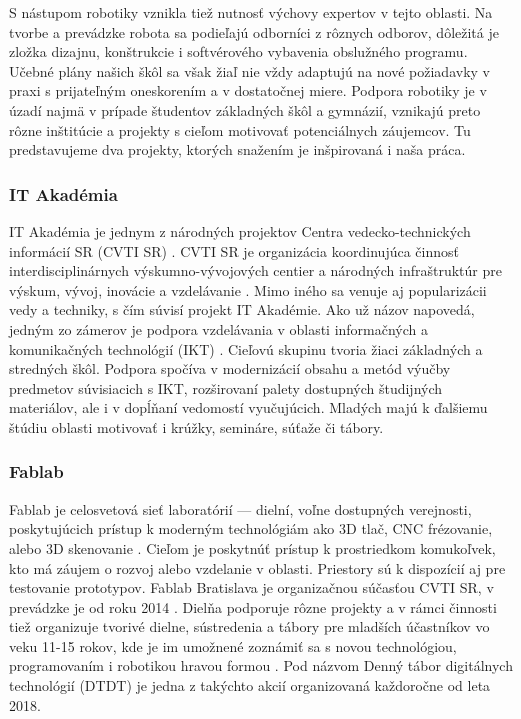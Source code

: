 S nástupom robotiky vznikla tiež nutnosť výchovy expertov v tejto oblasti. Na tvorbe a prevádzke robota sa podieľajú odborníci z rôznych odborov, dôležitá je zložka dizajnu, konštrukcie i softvérového vybavenia obslužného programu. Učebné plány našich škôl sa však žiaľ nie vždy adaptujú na nové požiadavky v praxi s prijateľným oneskorením a v dostatočnej miere. Podpora robotiky je v úzadí najmä v prípade študentov základných škôl a gymnázií, vznikajú preto rôzne inštitúcie a projekty s cieľom motivovať potenciálnych záujemcov. Tu predstavujeme dva projekty, ktorých snažením je inšpirovaná i naša práca.

\subsubsection*{IT Akadémia}
IT Akadémia je jednym z národných projektov Centra vedecko-technických informácií SR (CVTI SR) \cite{CVTISR-ITAkademia}. CVTI SR je organizácia koordinujúca činnosť interdisciplinárnych výskumno-vývojových centier a národných infraštruktúr pre výskum, vývoj, inovácie a vzdelávanie \cite{CVTISR}. Mimo iného sa venuje aj popularizácii vedy a techniky, s čím súvisí projekt IT Akadémie. Ako už názov napovedá, jedným zo zámerov je podpora vzdelávania v oblasti informačných a komunikačných technológií (IKT) \cite{ITAkademia}. Cieľovú skupinu tvoria žiaci základných a stredných škôl. Podpora spočíva v modernizácií obsahu a metód výučby predmetov súvisiacich s IKT, rozširovaní palety dostupných študijných materiálov, ale i v dopĺňaní vedomostí vyučujúcich. Mladých majú k ďalšiemu štúdiu oblasti motivovať i krúžky, semináre, súťaže či tábory.

\subsubsection*{Fablab}
Fablab je celosvetová sieť laboratórií --- dielní, voľne dostupných verejnosti, poskytujúcich prístup k moderným technológiám ako 3D tlač, CNC frézovanie, alebo 3D skenovanie \cite{Fablab}. Cieľom je poskytnúť prístup k prostriedkom komukoľvek, kto má záujem o rozvoj alebo vzdelanie v oblasti. Priestory sú k dispozícií aj pre testovanie prototypov. Fablab Bratislava je organizačnou súčasťou CVTI SR, v prevádzke je od roku 2014 \cite{FablabVedeckyParkUK}. Dielňa podporuje rôzne projekty a v rámci činnosti tiež organizuje tvorivé dielne, sústredenia a tábory pre mladších účastníkov vo veku 11-15 rokov, kde je im umožnené zoznámiť sa s novou technológiou, programovaním i robotikou hravou formou \cite{FablabDTDT}. Pod názvom Denný tábor digitálnych technológií (DTDT) je jedna z takýchto akcií organizovaná každoročne od leta 2018.